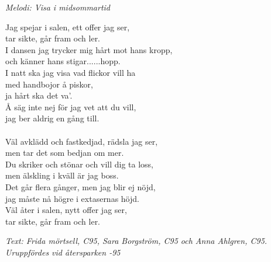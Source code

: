 {\footnotesize\textit{Melodi: Visa i midsommartid}}\par
\vspace{10pt}
Jag spejar i salen, ett offer jag ser,\\
tar sikte, går fram och ler.\\
I dansen jag trycker mig hårt mot hans kropp,\\
och känner hans stigar......hopp.\\
I natt ska jag visa vad flickor vill ha\\
med handbojor å piskor,\\
ja hårt ska det va'.\\
Å säg inte nej för jag vet att du vill,\\
jag ber aldrig en gång till.\\
\\
Väl avklädd och fastkedjad, rädsla jag ser,\\
men tar det som bedjan om mer.\\
Du skriker och stönar och vill dig ta loss,\\
men älskling i kväll är jag boss.\\
Det går flera gånger, men jag blir ej nöjd,\\
jag måste nå högre i extasernas höjd.\\
Väl åter i salen, nytt offer jag ser,\\
tar sikte, går fram och ler.
\par
\vspace{10pt}
{\footnotesize\textit{Text: Frida mörtsell, C95, Sara Borgström, C95 och Anna Ahlgren, C95. \\
					 Uruppfördes vid återsparken -95}}
